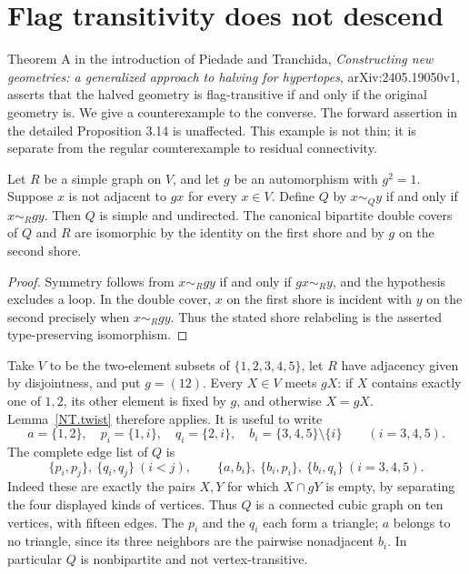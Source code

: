 \section{Flag transitivity does not descend}
Theorem A in the introduction of Piedade and Tranchida,
\emph{Constructing new geometries: a generalized approach to
halving for hypertopes}, arXiv:2405.19050v1, asserts that the halved
geometry is flag-transitive if and only if the original geometry is.
We give a counterexample to the converse. The forward assertion in
the detailed Proposition 3.14 is unaffected. This example is not thin;
it is separate from the regular counterexample to residual connectivity.

\begin{lemma}\label{NT.twist}
Let $R$ be a simple graph on $V$, and let $g$ be an automorphism with
$g^2=1$. Suppose $x$ is not adjacent to $gx$ for every $x\in V$.
Define $Q$ by $x\sim_Q y$ if and only if $x\sim_R gy$.
Then $Q$ is simple and undirected. The canonical bipartite double
covers of $Q$ and $R$ are isomorphic by the identity on the first
shore and by $g$ on the second shore.
\end{lemma}
\begin{proof}
Symmetry follows from $x\sim_R gy$ if and only if $gx\sim_R y$,
and the hypothesis excludes a loop. In the double cover, $x$ on the
first shore is incident with $y$ on the second precisely when
$x\sim_R gy$. Thus the stated shore relabeling is the asserted
type-preserving isomorphism.
\end{proof}

Take $V$ to be the two-element subsets of $\{1,2,3,4,5\}$, let
$R$ have adjacency given by disjointness, and put $g=(12)$.
Every $X\in V$ meets $gX$: if $X$ contains exactly one of $1,2$,
its other element is fixed by $g$, and otherwise $X=gX$.
Lemma~\ref{NT.twist} therefore applies. It is useful to write
\[
 a=\{1,2\},\quad p_i=\{1,i\},\quad q_i=\{2,i\},\quad
 b_i=\{3,4,5\}\setminus\{i\}\qquad(i=3,4,5).
\]
The complete edge list of $Q$ is
\[
 \{p_i,p_j\},\ \{q_i,q_j\}\ (i<j),\qquad
 \{a,b_i\},\ \{b_i,p_i\},\ \{b_i,q_i\}\ (i=3,4,5).
\]
Indeed these are exactly the pairs $X,Y$ for which $X\cap gY$ is
empty, by separating the four displayed kinds of vertices. Thus
$Q$ is a connected cubic graph on ten vertices, with fifteen edges.
The $p_i$ and the $q_i$ each form a triangle; $a$ belongs to no
triangle, since its three neighbors are the pairwise nonadjacent
$b_i$. In particular $Q$ is nonbipartite and not vertex-transitive.

